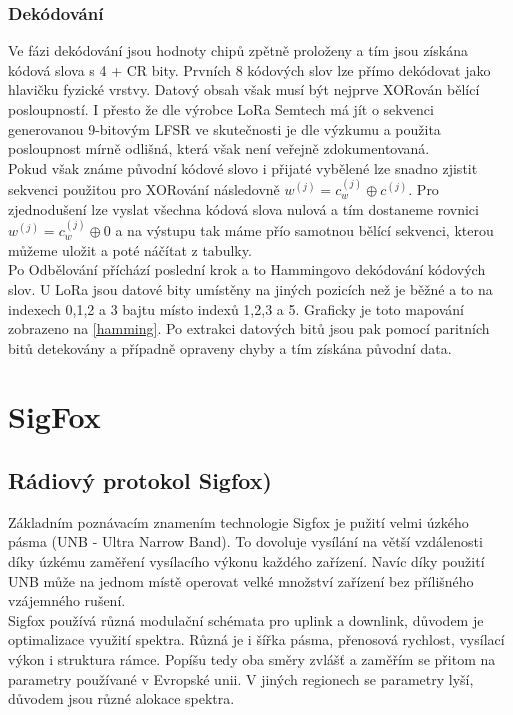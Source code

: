 \documentclass{ctuthesis}
\begin{document}
\subsection{Dekódování}
Ve fázi dekódování jsou hodnoty chipů zpětně proloženy a tím jsou získána kódová slova s 4 + CR bity. Prvních 8 kódových slov lze přímo dekódovat jako hlavičku fyzické vrstvy. Datový obsah však musí být nejprve XORován bělící posloupností. I přesto že dle výrobce LoRa Semtech má jít o sekvenci generovanou 9-bitovým LFSR ve skutečnosti je dle výzkumu \cite{gr-lora2016} a \cite{limesdrlora} použita posloupnost mírně odlišná, která však není veřejně zdokumentovaná.\\
Pokud však známe původní  kódové slovo i přijaté vybělené lze snadno zjistit sekvenci použitou pro XORování následovně
$w^{(j)} = c_w^{(j)} \oplus c^{(j)}$. Pro zjednodušení lze vyslat všechna kódová slova nulová a tím dostaneme rovnici $w^{(j)} = c_w^{(j)} \oplus 0$ a na výstupu tak máme přío samotnou bělící sekvenci, kterou můžeme uložit a poté náčítat z tabulky. \\
Po Odbělování příchází poslední krok a to Hammingovo dekódování kódových slov. U LoRa jsou datové bity umístěny na jiných pozicích než je běžné a to na indexech 0,1,2 a 3 bajtu místo indexů 1,2,3 a 5. Graficky je toto mapování zobrazeno na \ref{hamming}. Po extrakci datových bitů jsou pak pomocí paritních bitů detekovány a případně opraveny chyby a tím získána původní data.


\chapter{SigFox}
\section{Rádiový protokol Sigfox)}

Základním poznávacím znamením technologie Sigfox je pužití velmi úzkého pásma (UNB - Ultra Narrow Band). To dovoluje vysílání na větší vzdálenosti díky úzkému zaměření vysílacího výkonu každého zařízení. Navíc díky použití UNB může na jednom místě operovat velké množství zařízení bez přílišného vzájemného rušení. \\
Sigfox používá různá modulační schémata pro uplink a downlink, důvodem je optimalizace využití spektra. Různá je i šířka pásma, přenosová rychlost, vysílací výkon i struktura rámce. Popíšu tedy oba směry zvlášť a zaměřím se přitom na parametry používané v Evropské unii. V jiných regionech se parametry lyší, důvodem jsou různé alokace spektra.
\end{document}
